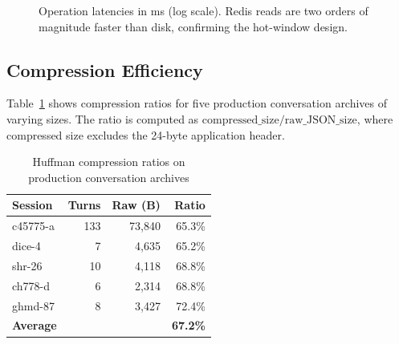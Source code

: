 \documentclass[conference]{IEEEtran}
\begin{document}
\begin{figure}[h]
\centering
{}
\caption{Operation latencies in ms (log scale). Redis reads are two orders of magnitude faster than disk, confirming the hot-window design.}
\label{fig:latency}
\end{figure}

\subsection{Compression Efficiency}

Table~\ref{tab:compression} shows compression ratios for five production conversation archives of varying sizes. The ratio is computed as $\text{compressed\_size} / \text{raw\_JSON\_size}$, where compressed size excludes the 24-byte application header.

\begin{table}[h]
\centering
\caption{Huffman compression ratios on production conversation archives}
\label{tab:compression}
\begin{tabular}{lrrr}
\toprule
\textbf{Session} & \textbf{Turns} & \textbf{Raw (B)} & \textbf{Ratio} \\
\midrule
c45775-a & 133 & 73{,}840 & 65.3\% \\
dice-4 & 7 & 4{,}635 & 65.2\% \\
shr-26 & 10 & 4{,}118 & 68.8\% \\
ch778-d & 6 & 2{,}314 & 68.8\% \\
ghmd-87 & 8 & 3{,}427 & 72.4\% \\
\midrule
\textbf{Average} & & & \textbf{67.2\%} \\
\bottomrule
\end{tabular}
\end{table}
\end{document}
